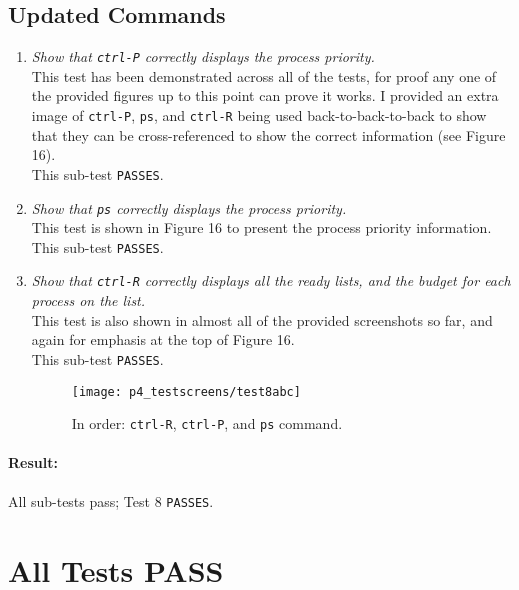 \documentclass[11pt,letterpaper]{report}
\begin{document}
	\subsection{Updated Commands}
	\begin{enumerate}
		\item \emph{Show that {\tt ctrl-P} correctly displays the process priority.}\\
		This test has been demonstrated across all of the tests, for proof any one of the provided figures up to this point can prove it works. I provided an extra image of {\tt ctrl-P}, {\tt ps}, and {\tt ctrl-R} being used back-to-back-to-back to show that they can be cross-referenced to show the correct information (see {\color{red} Figure 16}).\\
		This sub-test {\tt PASSES}.
		
		\item \emph{Show that {\tt ps} correctly displays the process priority.}\\
		This test is shown in {\color{red} Figure 16} to present the process priority information.\\
		This sub-test {\tt PASSES}.
		
		\item \emph{Show that {\tt ctrl-R} correctly displays all the ready lists, and the budget for each process on the list.}\\
		This test is also shown in almost all of the provided screenshots so far, and again for emphasis at the top of {\color{red} Figure 16}.\\
		This sub-test {\tt PASSES}.
		
		\begin{figure}
			\centering
			\texttt{[image: p4\_testscreens/test8abc]}
			\caption{In order: {\tt ctrl-R}, {\tt ctrl-P}, and {\tt ps} command.}
			\label{fig:test8abc}
		\end{figure}
	\end{enumerate}
	\paragraph{Result:}All sub-tests pass; Test 8 {\tt PASSES}.
	
	\section*{All Tests PASS}
	
\end{document}
